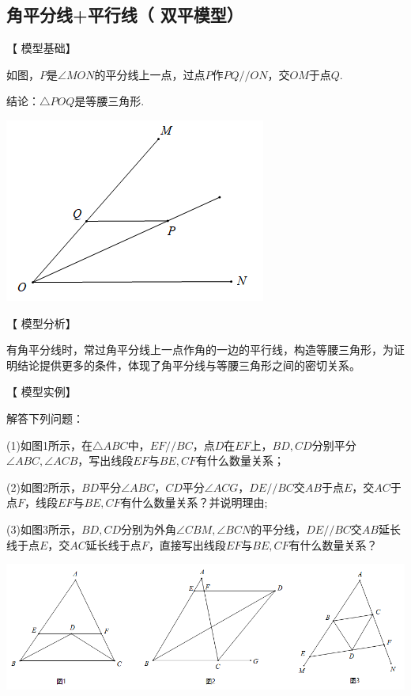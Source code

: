 \documentclass[10pt]{ctexart}
\begin{document}
\subsection[双平模型]{角平分线+平行线（ 双平模型）}

【 {\heiti 模型基础}】

如图，$P$是$\angle MON$的平分线上一点，过点$P$作$PQ//ON$，交$OM$于点$Q$.

结论：$\triangle POQ$是等腰三角形.

\begin{flushright}
	\includegraphics[scale=0.6]{figure/jiaopfxian17}
\end{flushright}

【 {\heiti 模型分析}】

有角平分线时，常过角平分线上一点作角的一边的平行线，构造等腰三角形，为证明结论提供更多的条件，体现了角平分线与等腰三角形之间的密切关系。


【 {\heiti 模型实例}】

\begin{shaded}
解答下列问题：

(1)如图1所示，在$\triangle ABC$中，$EF//BC$，点$D$在$EF$上，$BD,CD$分别平分$\angle ABC,\angle ACB$，写出线段$EF$与$BE,CF$有什么数量关系；

(2)如图2所示，$BD$平分$\angle ABC$，$CD$平分$\angle ACG$，$DE//BC$交$AB$于点$E$，交$AC$于点$F$，线段$EF$与$BE,CF$有什么数量关系？并说明理由;

(3)如图3所示，$BD,CD$分别为外角$\angle CBM,\angle BCN$的平分线，$DE//BC$交$AB$延长线于点$E$，交$AC$延长线于点$F$，直接写出线段$EF$与$BE,CF$有什么数量关系？ 
\end{shaded}

\begin{flushright}
	\includegraphics[scale=0.6]{figure/jiaopfxian18}
\end{flushright}
\end{document}
